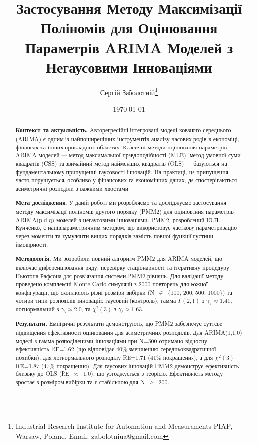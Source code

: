 \documentclass[12pt,a4paper]{article}
\title{Застосування Методу Максимізації Поліномів для Оцінювання Параметрів ARIMA Моделей з Негаусовими Інноваціями}
\author{Сергій Заболотній\thanks{Industrial Research Institute for Automation and Measurements PIAP, Warsaw, Poland. Email: zabolotniua@gmail.com}}
\date{\today}
\begin{document}
	
	\maketitle
	
	\begin{abstract}
		
		\textbf{Контекст та актуальність.} Авторегресійні інтегровані моделі ковзного середнього (ARIMA) є одним із найпоширеніших інструментів аналізу часових рядів в економіці, фінансах та інших прикладних областях. Класичні методи оцінювання параметрів ARIMA моделей --- метод максимальної правдоподібності (MLE), метод умовної суми квадратів (CSS) та звичайний метод найменших квадратів (OLS) --- базуються на фундаментальному припущенні гаусовості інновацій. На практиці, це припущення часто порушується, особливо у фінансових та економічних даних, де спостерігаються асиметричні розподіли з важкими хвостами.
		
		\textbf{Мета дослідження.} У даній роботі ми розробляємо та досліджуємо застосування методу максимізації поліномів другого порядку (PMM2) для оцінювання параметрів ARIMA(p,d,q) моделей з негаусовими інноваціями. PMM2, розроблений Ю.П. Кунченко, є напівпараметричним методом, що використовує часткову параметризацію через моменти та кумулянти вищих порядків замість повної функції густини ймовірності.
		
		\textbf{Методологія.} Ми розробили повний алгоритм PMM2 для ARIMA моделей, що включає диференціювання ряду, перевірку стаціонарності та ітеративну процедуру Ньютона-Рафсона для розв'язання системи PMM2 рівнянь. Для валідації методу проведено комплексні Monte Carlo симуляції з 2000 повторень для кожної конфігурації, що охоплюють різні розміри вибірки (N~$\in$~\{100, 200, 500, 1000\}) та чотири типи розподілів інновацій: гаусовий (контроль), гамма $\Gamma(2,1)$ з $\gamma_3 \approx 1.41$, логнормальний з $\gamma_3 \approx 2.0$, та $\chi^2(3)$ з $\gamma_3 \approx 1.63$.
		
		\textbf{Результати.} Емпіричні результати демонструють, що PMM2 забезпечує суттєве підвищення ефективності оцінювання для асиметричних розподілів. Для ARIMA(1,1,0) моделі з гамма-розподіленими інноваціями при N=500 отримано відносну ефективність RE=1.62 (що відповідає 40\% зменшенню середньоквадратичної похибки), для логнормального розподілу RE=1.71 (41\% покращення), а для $\chi^2(3)$ RE=1.87 (47\% покращення). Для гаусових інновацій PMM2 демонструє ефективність близьку до OLS (RE~$\approx$~1.0), що узгоджується з теорією. Ефективність методу зростає з розміром вибірки та є стабільною для N~$\geq$~200.
		

\end{abstract}
\end{document}
